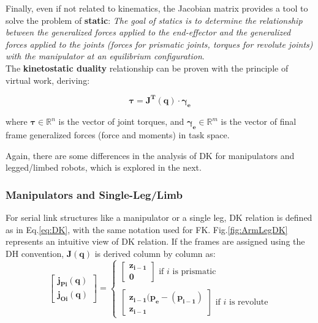 Finally, even if not related to kinematics, the Jacobian matrix provides a tool to solve the problem of \textbf{static}:
\textit{The goal of statics is to determine the relationship between the generalized
forces applied to the end-eﬀector and the generalized forces applied to the joints (forces for prismatic joints, torques for revolute joints) with the
manipulator at an equilibrium conﬁguration}\cite{Siciliano}.\\
The \textbf{kinetostatic duality} relationship can be proven with the principle of virtual work, deriving: 

\begin{equation}
\label{eq:Static}
\mathbf{\tau}  = \mathbf{J^T(\mathbf{q})}\cdot\mathbf{\gamma_{e}}
\end{equation}

where $\mathbf{\tau}\in \mathbb{R}^n$ is the vector of joint torques, and  $\mathbf{\gamma_{e}} \in \mathbb{R}^m$ is the vector of final frame generalized forces (force and moments) in task space. 

Again, there are some differences in the analysis of DK for manipulators and legged/limbed robots, which is explored in the next. 

\subsubsection{Manipulators and Single-Leg/Limb}
\label{sec:manipulatorDK}
For serial link structures like a manipulator or a single leg, DK relation is defined as in Eq.\ref{eq:DK}, with the same notation used for FK.
Fig.\ref{fig:ArmLegDK} represents an intuitive view of DK relation. 
If the frames are assigned using the DH convention, $\mathbf{J(\mathbf{q})}$ is derived column by column as: 
\begin{equation}
\label{eq:JacobianFormulaArm}
    \begin{bmatrix}
    \mathbf{j_{Pi}(\mathbf{q})}\\
    \mathbf{j_{Oi}(\mathbf{q})}    \end{bmatrix} = 
    \begin{cases}
    \begin{bmatrix}
    \mathbf{z_{i-1}}\\
    \mathbf{0}  \end{bmatrix}  \text{ if $i$ is prismatic}\\ \\ 
    \begin{bmatrix}
    \mathbf{z_{i-1}} (\mathbf{p_{e}} -  (\mathbf{p_{i-1}})\\
    \mathbf{z_{i-1}}\end{bmatrix} \text{ if $i$ is revolute}
    \end{cases}
\end{equation}

